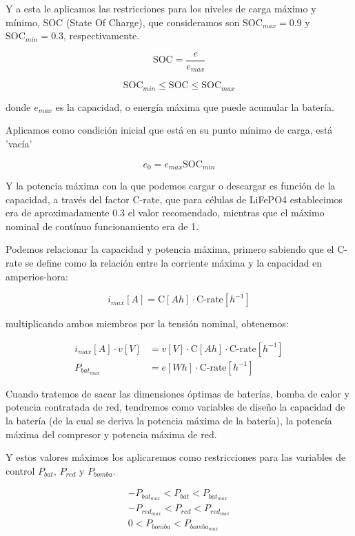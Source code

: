 Y a esta le aplicamos las restricciones para los niveles de carga máximo y
mínimo, SOC (State Of Charge), que consideramos son $\text{SOC}_{max} = 0.9$ y
$\text{SOC}_{min} = 0.3$, respectivamente.


\begin{equation}
	\text{SOC} = \frac{e}{e_{max}}
\end{equation}

\begin{equation}
	\text{SOC}_{min} \leq \text{SOC} \leq \text{SOC}_{max}
\end{equation}

donde $e_{max}$ es la capacidad, o energía máxima que puede acumular la batería.


Aplicamos como condición inicial que está en su punto mínimo de carga,
está 'vacía'

\begin{equation}
	e_0 = e_{max} \text{SOC}_{min}
\end{equation}

Y la potencia máxima con la que podemos cargar o descargar es función de la capacidad,
a través del factor C-rate, que para células de LiFePO4 establecimos era de aproximadamente
0.3 el valor recomendado, mientras que el máximo nominal de contínuo funcionamiento era de 1.

Podemos relacionar la capacidad y potencia máxima, primero sabiendo que
el C-rate se define como la relación entre la corriente máxima y la capacidad en amperios-hora:

\begin{equation}
	i_{max}[A] = \text{C}[Ah] \cdot \text{C-rate}[h^{-1}]
\end{equation}

multiplicando ambos miembros por la tensión nominal, obtenemos:

\begin{align}
	i_{max}[A] \cdot v[V] & = v[V] \cdot \text{C}[Ah] \cdot \text{C-rate}[h^{-1}] \\
	P_{bat_{max}}         & = e[Wh] \cdot \text{C-rate}[h^{-1}]
\end{align}

Cuando tratemos de sacar las dimensiones óptimas de baterías, bomba de calor y
potencia contratada de red, tendremos como variables de diseño la capacidad de
la batería (de la cual se deriva la potencia máxima de la batería), la potencía
máxima del compresor y potencia máxima de red.

Y estos valores máximos los aplicaremos como restricciones para las variables
de control $P_{bat}$, $P_{red}$ y $P_{bomba}$.

\begin{align}
	-P_{bat_{max}} < P_{bat} < P_{bat_{max}} \\
	-P_{red_{max}} < P_{red} < P_{red_{max}} \\
	0 < P_{bomba} < P_{bomba_{max}}
\end{align}
